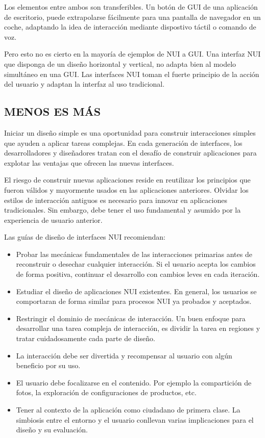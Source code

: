 Los elementos entre ambos son transferibles. Un botón de GUI de una aplicación
de escritorio, puede extrapolarse fácilmente para una pantalla de navegador en
un coche, adaptando la idea de interacción mediante dispostivo táctil o comando
de voz.

Pero esto no es cierto en la mayoría de ejemplos de NUI a GUI. Una interfaz NUI
que disponga de un diseño horizontal y vertical, no adapta bien al modelo
simultáneo en una GUI. Las interfaces NUI toman el fuerte principio de la acción
del usuario y adaptan la interfaz al uso tradicional.

\subsection{\uppercase{Menos es más}}

Iniciar un diseño simple es una oportunidad para construir interacciones simples
que ayuden a aplicar tareas complejas. En cada generación de interfaces, los
desarrolladores y diseñadores tratan con el desafío de construir 
aplicaciones para explotar las ventajas que ofrecen las
nuevas interfaces.

El riesgo de construir nuevas aplicaciones reside en reutilizar los principios
que fueron válidos y mayormente usados en las aplicaciones anteriores. Olvidar
los estilos de interacción antiguos es necesario para innovar en aplicaciones 
tradicionales. Sin embargo, debe tener el uso fundamental y asumido
por la experiencia de usuario anterior.

Las guías de diseño de interfaces NUI recomiendan:

\begin{itemize}
  \item Probar las mecánicas fundamentales de las interacciones primarias antes
  de reconstruir o desechar cualquier interacción. Si el usuario acepta los
  cambios de forma positiva, continuar el desarrollo con cambios leves en cada
  iteración.
  \item Estudiar el diseño de aplicaciones NUI existentes. En general, los
  usuarios se comportaran de forma similar para procesos NUI ya probados y
  aceptados.
  \item Restringir el dominio de mecánicas de interacción. Un buen enfoque para
  desarrollar una tarea compleja de interacción, es dividir la tarea en regiones
  y tratar cuidadosamente cada parte de diseño.
  \item La interacción debe ser divertida y recompensar al usuario
  con algún beneficio por su uso.
  \item El usuario debe focalizarse en el contenido. Por ejemplo la
  compartición de fotos, la exploración de configuraciones de
  productos, etc.
  \newpage
  \item Tener al contexto de la aplicación como ciudadano de primera clase. La
  simbiosis entre el entorno y el usuario conllevan varias implicaciones para el
  diseño y su evaluación.
\end{itemize}

